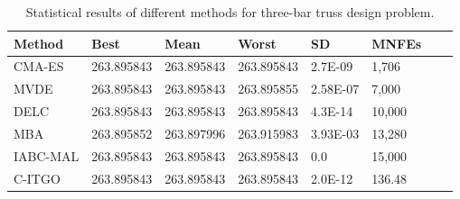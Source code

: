 
\begin{table*}[tp]
    \tiny
\begin{center}

\begin{tabular}{ P{2.0cm} P{2.0cm} P{2.0cm} P{2.0cm} P{2.0cm} P{2.0cm} P{2.0cm} P{2.0cm}  }
\hline
\textbf{Method} & \textbf{Best} & \textbf{Mean} & \textbf{Worst} & \textbf{SD} & \textbf{MNFEs} \\
\hline

CMA-ES & 263.895843 & 263.895843 & 263.895843 & 2.7E-09 & 1,706 \\
MVDE & 263.895843 & 263.895843 & 263.895855 & 2.58E-07 & 7,000 \\
DELC & 263.895843 & 263.895843 & 263.895843 & 4.3E-14 & 10,000 \\
MBA & 263.895852 & 263.897996 & 263.915983 & 3.93E-03 & 13,280 \\
IABC-MAL & 263.895843 & 263.895843 & 263.895843 & 0.0 & 15,000 \\
C-ITGO & 263.895843 & 263.895843 & 263.895843 & 2.0E-12 & 136.48 \\


\hline
\end{tabular}
\end{center}
\vspace*{-6mm}
\caption{Statistical results of different methods for three-bar truss design problem. \\[1em]}
\label{tab:TB}
\end{table*}

